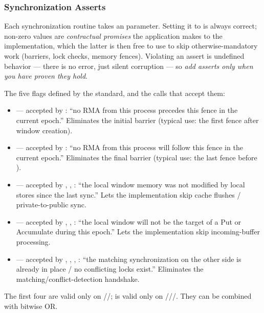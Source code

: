 \subsubsection{Synchronization Asserts}

Each synchronization routine takes an  parameter. Setting it to  is always correct; non-zero values are \emph{contractual promises} the application makes to the implementation, which the latter is then free to use to skip otherwise-mandatory work (barriers, lock checks, memory fences). Violating an assert is undefined behavior --- there is no error, just silent corruption --- so \emph{add asserts only when you have proven they hold}.

The five flags defined by the standard, and the calls that accept them:

\begin{itemize}
    \item {} --- accepted by : ``no RMA from this process precedes this fence in the current epoch.'' Eliminates the initial barrier (typical use: the first fence after window creation).
    \item {} --- accepted by : ``no RMA from this process will follow this fence in the current epoch.'' Eliminates the final barrier (typical use: the last fence before ).
    \item {} --- accepted by , , : ``the local window memory was not modified by local stores since the last sync.'' Lets the implementation skip cache flushes / private-to-public sync.
    \item {} --- accepted by , , : ``the local window will not be the target of a Put or Accumulate during this epoch.'' Lets the implementation skip incoming-buffer processing.
    \item {} --- accepted by , , , : ``the matching synchronization on the other side is already in place / no conflicting locks exist.'' Eliminates the matching/conflict-detection handshake.
\end{itemize}

The first four are valid only on //;  is valid only on ///. They can be combined with bitwise OR.

